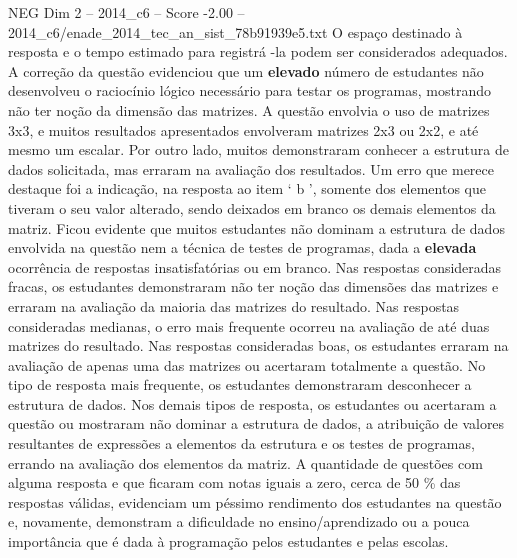 \begin{textsample}{NEG Dim 2 – 2014\_c6 – Score -2.00 – 2014\_c6/enade\_2014\_tec\_an\_sist\_78b91939e5.txt}
O espaço destinado à resposta e o tempo estimado para registrá -la podem ser considerados adequados.
A correção da questão evidenciou que um \textbf{elevado} número de estudantes não desenvolveu o raciocínio lógico necessário para testar os programas, mostrando não ter noção da dimensão das matrizes.
A questão envolvia o uso de matrizes 3x3, e muitos resultados apresentados envolveram matrizes 2x3 ou 2x2, e até mesmo um escalar.
Por outro lado, muitos demonstraram conhecer a estrutura de dados solicitada, mas erraram na avaliação dos resultados.
Um erro que merece destaque foi a indicação, na resposta ao item ‘ b ’, somente dos elementos que tiveram o seu valor alterado, sendo deixados em branco os demais elementos da matriz.
Ficou evidente que muitos estudantes não dominam a estrutura de dados envolvida na questão nem a técnica de testes de programas, dada a \textbf{elevada} ocorrência de respostas insatisfatórias ou em branco.
Nas respostas consideradas fracas, os estudantes demonstraram não ter noção das dimensões das matrizes e erraram na avaliação da maioria das matrizes do resultado.
Nas respostas consideradas medianas, o erro mais frequente ocorreu na avaliação de até duas matrizes do resultado.
Nas respostas consideradas boas, os estudantes erraram na avaliação de apenas uma das matrizes ou acertaram totalmente a questão.
No tipo de resposta mais frequente, os estudantes demonstraram desconhecer a estrutura de dados.
Nos demais tipos de resposta, os estudantes ou acertaram a questão ou mostraram não dominar a estrutura de dados, a atribuição de valores resultantes de expressões a elementos da estrutura e os testes de programas, errando na avaliação dos elementos da matriz.
A quantidade de questões com alguma resposta e que ficaram com notas iguais a zero, cerca de 50 \% das respostas válidas, evidenciam um péssimo rendimento dos estudantes na questão e, novamente, demonstram a dificuldade no ensino/aprendizado ou a pouca importância que é dada à programação pelos estudantes e pelas escolas.

\end{textsample}
